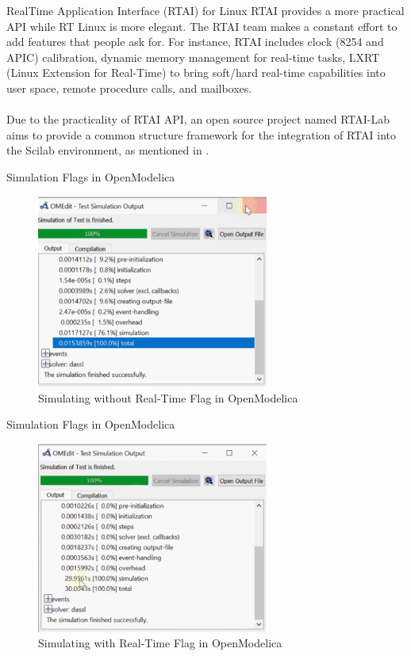 \documentclass{beamer}
\begin{document}
\begin{frame}{RealTime Application Interface (RTAI) for Linux}
RTAI provides a more practical API while RT Linux is more elegant. The RTAI team makes a constant effort to add features that people ask for. For instance, RTAI includes clock (8254 and APIC) calibration, dynamic memory management for real-time tasks, LXRT (Linux Extension for Real-Time) to bring soft/hard real-time capabilities into user space, remote procedure calls, and mailboxes. \\~\\

Due to the practicality of RTAI API, an open source project named RTAI-Lab aims to provide a common structure framework for the integration of RTAI into the Scilab environment, as mentioned in \cite{scilab-rtai}. 
\end{frame}

\begin{frame}{Simulation Flags in OpenModelica}
\begin{figure}[h]
    \centering
    \includegraphics[width=0.68\textwidth]{images/without-rt.png}
    \caption{Simulating without Real-Time Flag in OpenModelica}
\end{figure}
\end{frame}

\begin{frame}{Simulation Flags in OpenModelica}
\begin{figure}[h]
    \centering
    \includegraphics[width=0.68\textwidth]{images/with-rt.png}
    \caption{Simulating with Real-Time Flag in OpenModelica}
\end{figure}
\end{frame}
\end{document}
